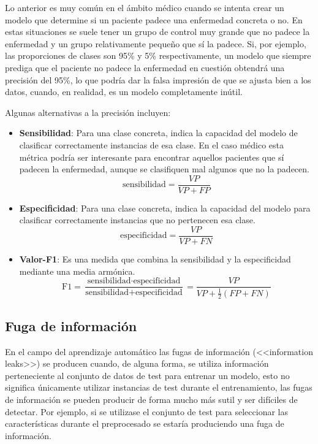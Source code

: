Lo anterior es muy común en el ámbito médico cuando se intenta crear un modelo
que determine si un paciente padece una enfermedad concreta o no. En estas
situaciones se suele tener un grupo de control muy grande que no padece la
enfermedad y un grupo relativamente pequeño que sí la padece. Si, por ejemplo,
las proporciones de clases son 95\% y 5\% respectivamente, un modelo que siempre
prediga que el paciente no padece la enfermedad en cuestión obtendrá una
precisión del 95\%, lo que podría dar la falsa impresión de que se ajusta bien a
los datos, cuando, en realidad, es un modelo completamente inútil.

Algunas alternativas a la precisión incluyen:

\begin{itemize}
    \item \textbf{Sensibilidad}: Para una clase concreta, indica la capacidad
    del modelo de clasificar correctamente instancias de esa clase. En el caso
    médico esta métrica podría ser interesante para encontrar aquellos pacientes
    que sí padecen la enfermedad, aunque se clasifiquen mal algunos que no la
    padecen.
    $$
    \text{sensibilidad} = \frac{VP}{VP + FP}
    $$
    \item \textbf{Especificidad}: Para una clase concreta, indica la capacidad
    del modelo para clasificar correctamente instancias que no pertenecen esa
    clase.
    $$
    \text{especificidad} = \frac{VP}{VP + FN}
    $$
    \item \textbf{Valor-F1}: Es una medida que combina la sensibilidad y la
    especificidad mediante una media armónica.
    $$
    \text{F1}
    = \frac{\text{sensibilidad}\cdot\text{especificidad}}{\text{sensibilidad} + \text{especificidad}}
    = \frac{VP}{VP + \frac{1}{2}(FP + FN)}
    $$
\end{itemize}

\subsection{Fuga de información}

En el campo del aprendizaje automático las fugas de información (<<information
leaks>>) se producen cuando, de alguna forma, se utiliza información perteneciente
al conjunto de datos de test para entrenar un modelo, esto no significa
únicamente utilizar instancias de test durante el entrenamiento, las fugas de
información se pueden producir de forma mucho más sutil y ser difíciles de
detectar. Por ejemplo, si se utilizase el conjunto de test para seleccionar las
características durante el preprocesado se estaría produciendo una fuga de
información.

